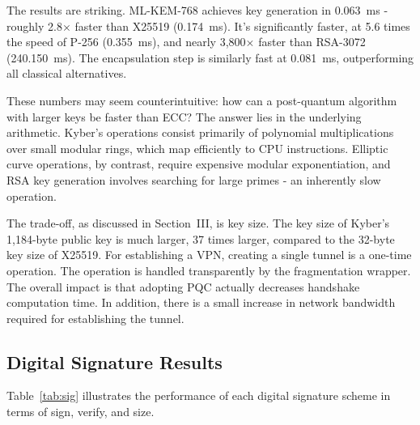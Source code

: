 \documentclass[10pt, conference, letterpaper]{IEEEtran}
\begin{document}
\begin{table}[hbt!]
\centering
\caption{KEM / Key Exchange Performance (mean of 25 iterations)}
\label{tab:kem}
\end{table}

The results are striking. ML-KEM-768 achieves key generation in 0.063~ms - roughly 2.8$\times$ faster than X25519 (0.174~ms). It's significantly faster, at 5.6 times the speed of P-256 (0.355~ms), and nearly 3,800$\times$ faster than RSA-3072 (240.150~ms). The encapsulation step is similarly fast at 0.081~ms, outperforming all classical alternatives.

These numbers may seem counterintuitive: how can a post-quantum algorithm with larger keys be faster than ECC? The answer lies in the underlying arithmetic. Kyber's operations consist primarily of polynomial multiplications over small modular rings, which map efficiently to CPU instructions. Elliptic curve operations, by contrast, require expensive modular exponentiation, and RSA key generation involves searching for large primes - an inherently slow operation.

The trade-off, as discussed in Section~III, is key size. The key size of Kyber's 1,184-byte public key is much larger, 37 times larger, compared to the 32-byte key size of X25519. For establishing a VPN, creating a single tunnel is a one-time operation. The operation is handled transparently by the fragmentation wrapper. The overall impact is that adopting PQC actually decreases handshake computation time. In addition, there is a small increase in network bandwidth required for establishing the tunnel.

\subsection{Digital Signature Results}
Table~\ref{tab:sig} illustrates the performance of each digital signature scheme in terms of sign, verify, and size.
\end{document}
